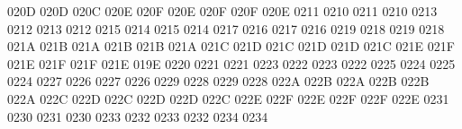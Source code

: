 \setcclcuc 020D 020D 020C %
\setcclcuc 020E 020F 020E %
\setcclcuc 020F 020F 020E %
 0211 0210 %
 0211 0210 %
 0213 0212 %
 0213 0212 %
 0215 0214 %
 0215 0214 %
 0217 0216 %
 0217 0216 %
 0219 0218 %
 0219 0218 %
\setcclcuc 021A 021B 021A %
\setcclcuc 021B 021B 021A %
\setcclcuc 021C 021D 021C %
\setcclcuc 021D 021D 021C %
\setcclcuc 021E 021F 021E %
\setcclcuc 021F 021F 021E %
 019E 0220 %
 0221 0221 %
 0223 0222 %
 0223 0222 %
 0225 0224 %
 0225 0224 %
 0227 0226 %
 0227 0226 %
 0229 0228 %
 0229 0228 %
\setcclcuc 022A 022B 022A %
\setcclcuc 022B 022B 022A %
\setcclcuc 022C 022D 022C %
\setcclcuc 022D 022D 022C %
\setcclcuc 022E 022F 022E %
\setcclcuc 022F 022F 022E %
 0231 0230 %
 0231 0230 %
 0233 0232 %
 0233 0232 %
 0234 0234 %
